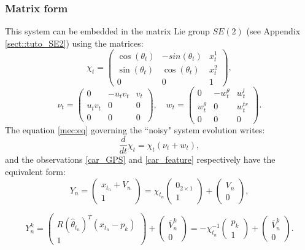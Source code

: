 \documentclass[a4paper,12pt,onecolumn]{article}
\begin{document}
\subsubsection{Matrix form}
This system can be embedded in the matrix Lie group $SE(2)$ (see Appendix \ref{sect::tuto_SE2}) using the   matrices:
$$
{ \chi_t = \begin{pmatrix} \cos(\theta_t) & -sin(\theta_t) & x^1_t \\ \sin(\theta_t) & \cos(\theta_t) & x^2_t \\ 0 & 0 & 1 \end{pmatrix},}$$
$${\nu_t = \begin{pmatrix} 0 & -u_t v_t & v_t \\ u_t v_t & 0 & 0 \\ 0 & 0 & 0 \end{pmatrix},} \quad {w_t = \begin{pmatrix} 0 &  -w^\theta_t & w_t^l \\ w_t^\theta & 0 & {w_t^{tr}} \\
0 & 0 & 0 \end{pmatrix} }.
$$
 The equation \eqref{mec:eq} governing the ``noisy" system evolution writes:
\begin{equation}
\frac{d}{dt} \chi_t = \chi_t (\nu_t + w_t), \label{eq::car_matrix}
\end{equation}
and the observations \eqref{car_GPS} and \eqref{car_feature}  respectively have the equivalent form:
\begin{equation}
\label{eq::car_matrix_GPS}
Y_n = \begin{pmatrix} x_{t_n} + V_n \\ 1 \end{pmatrix} = \chi_{t_n} \begin{pmatrix} 0_{2 \times 1} \\ 1 \end{pmatrix} + \begin{pmatrix} V_n \\ 0 \end{pmatrix},
\end{equation}

\begin{equation}
\label{eq::car_matrix_feature}
Y_n^k = \begin{pmatrix} R(\hat{\theta}_{t_n})^T(x_{t_n}-p_k) \\ 1 \end{pmatrix} + \begin{pmatrix} \bar{V}_n^k \\ 0 \end{pmatrix} = - \chi_{t_n}^{-1} \begin{pmatrix} p_k \\ 1 \end{pmatrix} + \begin{pmatrix} \bar V_n^k \\ 0 \end{pmatrix}.
\end{equation}
\end{document}

